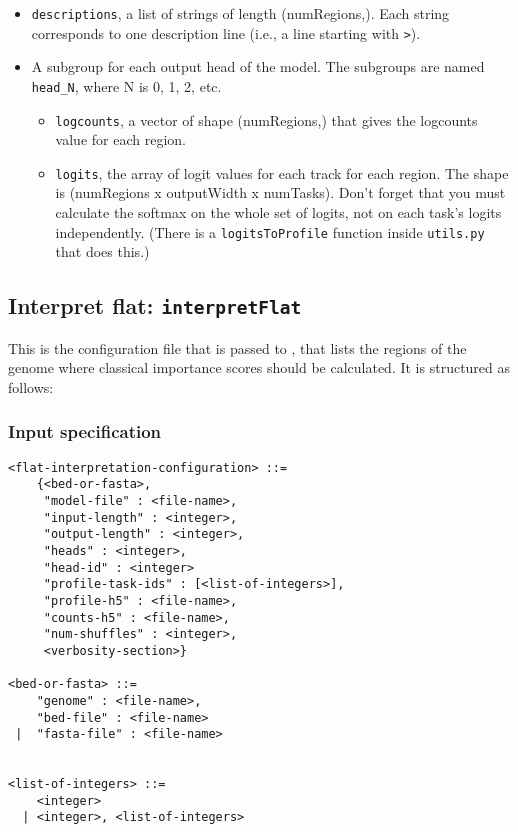 \documentclass{article}
\begin{document}
\begin{itemize}
    \item \texttt{descriptions}, a list of strings of length (numRegions,). Each string
        corresponds to one description line (i.e., a line starting with \texttt{>}).
    \item A subgroup for each output head of the model. The subgroups are named \texttt{head\_N},
        where N is 0, 1, 2, etc.
        \begin{itemize}
            \item \texttt{logcounts}, a vector of shape (numRegions,) that gives the logcounts
                value for each region.
            \item \texttt{logits}, the array of logit values for each track for each region.
                The shape is (numRegions x outputWidth x numTasks). Don't forget that you must
                calculate the softmax on the whole set of logits, not on each task's logits
                independently.
                (There is a \texttt{logitsToProfile} function inside \texttt{utils.py} that
                does this.)
        \end{itemize}
\end{itemize}



\newpage

\subsection{Interpret flat: \texttt{interpretFlat}}\label{prog:interpretFlat}

This is the configuration file that is passed to , that lists the regions of
the genome where classical importance scores should be calculated. It is structured as follows:

\subsubsection{Input specification}

\begin{lstlisting}
<flat-interpretation-configuration> ::=
    {<bed-or-fasta>,
     "model-file" : <file-name>,
     "input-length" : <integer>,
     "output-length" : <integer>,
     "heads" : <integer>,
     "head-id" : <integer>
     "profile-task-ids" : [<list-of-integers>],
     "profile-h5" : <file-name>,
     "counts-h5" : <file-name>,
     "num-shuffles" : <integer>,
     <verbosity-section>}

<bed-or-fasta> ::=
    "genome" : <file-name>,
    "bed-file" : <file-name>
 |  "fasta-file" : <file-name>


<list-of-integers> ::=
    <integer>
  | <integer>, <list-of-integers>
\end{lstlisting}
\end{document}
